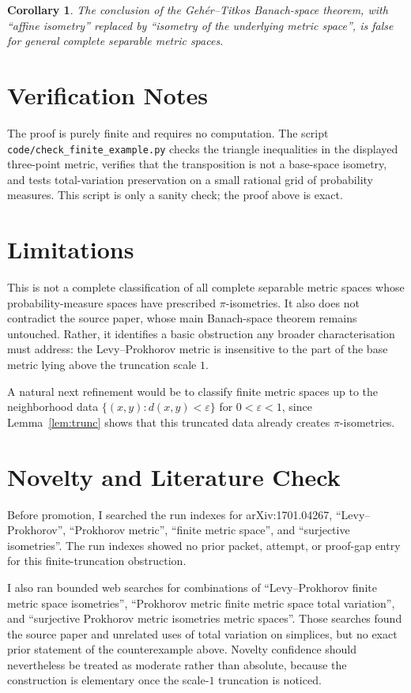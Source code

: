\documentclass[11pt]{article}
\newtheorem{corollary}{Corollary}
\begin{document}
\begin{corollary}
The conclusion of the Geh\'er--Titkos Banach-space theorem, with ``affine
isometry'' replaced by ``isometry of the underlying metric space'', is false
for general complete separable metric spaces.
\end{corollary}

\section*{Verification Notes}

The proof is purely finite and requires no computation.  The script
\texttt{code/check\_finite\_example.py} checks the triangle inequalities in
the displayed three-point metric, verifies that the transposition is not a
base-space isometry, and tests total-variation preservation on a small rational
grid of probability measures.  This script is only a sanity check; the proof
above is exact.

\section*{Limitations}

This is not a complete classification of all complete separable metric spaces
whose probability-measure spaces have prescribed \(\pi\)-isometries.  It also
does not contradict the source paper, whose main Banach-space theorem remains
untouched.  Rather, it identifies a basic obstruction any broader
characterisation must address: the Levy--Prokhorov metric is insensitive to
the part of the base metric lying above the truncation scale \(1\).

A natural next refinement would be to classify finite metric spaces up to the
neighborhood data \(\{(x,y):d(x,y)<\varepsilon\}\) for \(0<\varepsilon<1\),
since Lemma~\ref{lem:trunc} shows that this truncated data already creates
\(\pi\)-isometries.

\section*{Novelty and Literature Check}

Before promotion, I searched the run indexes for arXiv:1701.04267,
``Levy--Prokhorov'', ``Prokhorov metric'', ``finite metric space'', and
``surjective isometries''.  The run indexes showed no prior packet, attempt,
or proof-gap entry for this finite-truncation obstruction.

I also ran bounded web searches for combinations of ``Levy--Prokhorov finite
metric space isometries'', ``Prokhorov metric finite metric space total
variation'', and ``surjective Prokhorov metric isometries metric spaces''.
Those searches found the source paper and unrelated uses of total variation on
simplices, but no exact prior statement of the counterexample above.  Novelty
confidence should nevertheless be treated as moderate rather than absolute,
because the construction is elementary once the scale-\(1\) truncation is
noticed.
\end{document}
